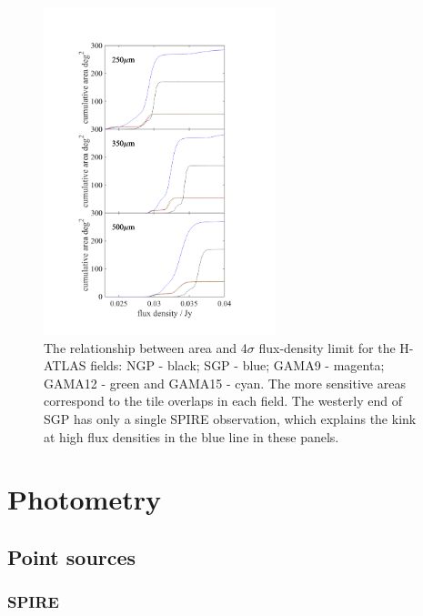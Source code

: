 \documentclass[a4paper,fleqn,usenatbib, twocolumn]{aastex61}
\begin{document}
\begin{figure} %
  \includegraphics[width=0.6\textwidth,trim=25mm 10mm -10mm 10mm]{flux_area.pdf}
\caption{The relationship between area and 4$\sigma$ flux-density
  limit for the H-ATLAS fields: NGP - black; SGP - blue; GAMA9 -
  magenta; GAMA12 - green and  GAMA15 - cyan.  The more sensitive areas
  correspond to the tile overlaps in each field.  The westerly end of
  SGP has only a single SPIRE observation, which explains the kink at
  high flux densities in the blue line in these panels.}

\label{fig_areas}
\end{figure} 

\section{Photometry}

\subsection{Point sources}

\subsubsection{SPIRE}
\end{document}

